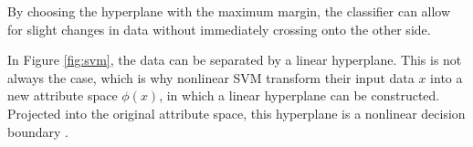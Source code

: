     By choosing the hyperplane with the maximum margin, the classifier can allow for slight changes in data without immediately crossing onto the other side.
    
    In Figure \ref{fig:svm}, the data can be separated by a linear hyperplane. This is not always the case, which is why nonlinear SVM transform their input data $x$ into a new attribute space $\phi(x)$, in which a linear hyperplane can be constructed. Projected into the original attribute space, this hyperplane is a nonlinear decision boundary \cite{DBLP:books/aw/TanSKK2019}.
    